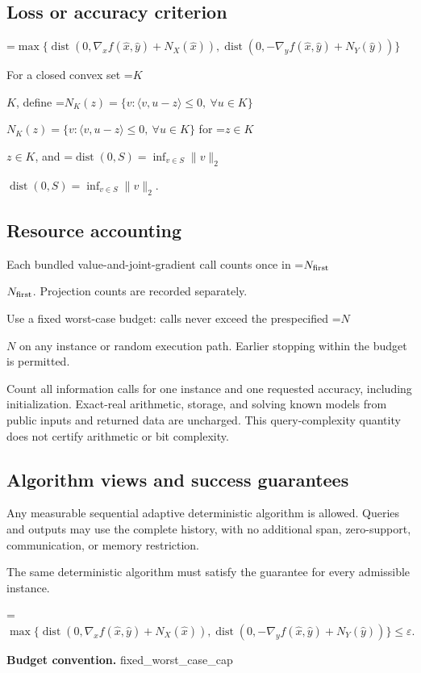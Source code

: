 \documentclass[10pt,a4paper]{article}
\newcommand{\AtlasMath}[1]{\par\begingroup\centering\setbox0=\hbox{$\displaystyle #1$}\ifdim\wd0>1.4\linewidth\typeout{ATLAS WIDE FORMULA: \the\wd0}\fi\ifdim\wd0>\linewidth\resizebox{\linewidth}{!}{\box0}\else\box0\fi\par\endgroup}
\newcommand{\AtlasInlineMath}[1]{\begingroup\setbox0=\hbox{$#1$}\ifdim\wd0>.4\linewidth\endgroup\AtlasMath{#1}\else\endgroup$#1$\fi}
\begin{document}
\subsection{Loss or accuracy criterion}

\AtlasMath{\max\{\operatorname{dist}(0,\nabla_xf(\widehat{x},\widehat{y})+N_X(\widehat{x})),\operatorname{dist}(0,-\nabla_yf(\widehat{x},\widehat{y})+N_Y(\widehat{y}))\}}


For a closed convex set \AtlasInlineMath{K}, define \AtlasInlineMath{N_K(z)=\{v:\langle v,u-z\rangle\le0,\ \forall u\in K\}} for \AtlasInlineMath{z\in K}, and \AtlasInlineMath{\operatorname{dist}(0,S)=\inf_{v\in S}\|v\|_2}.

\subsection{Resource accounting}
Each bundled value-and-joint-gradient call counts once in \AtlasInlineMath{N_{\rm first}}. Projection counts are recorded separately.

Use a fixed worst-case budget: calls never exceed the prespecified \AtlasInlineMath{N} on any instance or random execution path. Earlier stopping within the budget is permitted.

Count all information calls for one instance and one requested accuracy, including initialization. Exact-real arithmetic, storage, and solving known models from public inputs and returned data are uncharged. This query-complexity quantity does not certify arithmetic or bit complexity.

\subsection{Algorithm views and success guarantees}
Any measurable sequential adaptive deterministic algorithm is allowed. Queries and outputs may use the complete history, with no additional span, zero-support, communication, or memory restriction.

The same deterministic algorithm must satisfy the guarantee for every admissible instance.


\AtlasMath{\max\{\operatorname{dist}(0,\nabla_xf(\widehat{x},\widehat{y})+N_X(\widehat{x})),\operatorname{dist}(0,-\nabla_yf(\widehat{x},\widehat{y})+N_Y(\widehat{y}))\}\le\varepsilon.}


\textbf{Budget convention.} fixed\_worst\_case\_cap
\end{document}
